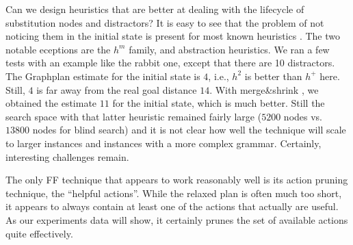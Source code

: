 Can we design heuristics that are better at dealing with the lifecycle
of substitution nodes and distractors? It is easy to see that the
problem of not noticing them in the initial state is present for most
known heuristics
\cite{helmert:icaps-04,richter:etal:aaai-08,karpas:domshlak-ijcai-09,helmert:domshlak:icaps-09,cai:etal:icaps-09}. The
two notable eceptions are the $h^m$ family, and abstraction
heuristics. We ran a few tests with an example like the rabbit one,
except that there are 10 distractors. The Graphplan estimate for the
initial state is $4$, i.e., $h^2$ is better than $h^+$ here. Still,
$4$ is far away from the real goal distance $14$. With merge\&shrink
\cite{helmert:etal:icaps07}, we obtained the estimate $11$ for the
initial state, which is much better. Still the search space with that
latter heuristic remained fairly large ($5200$ nodes vs.\ $13800$
nodes for blind search) and it is not clear how well the technique
will scale to larger instances and instances with a more complex
grammar. Certainly, interesting challenges remain.








The only FF technique that appears to work reasonably well is its
action pruning technique, the ``helpful actions''. While the relaxed
plan is often much too short, it appears to always contain at least
one of the actions that actually are useful. As our experiments data
will show, it certainly prunes the set of available actions quite
effectively.




